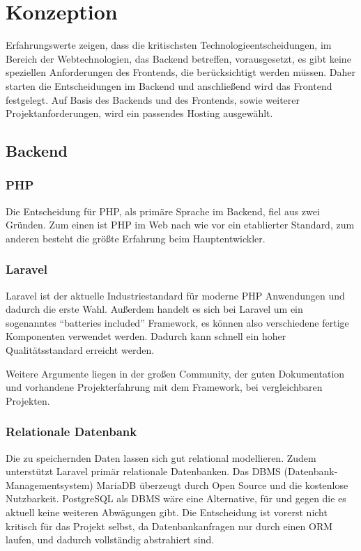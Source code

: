 \section{Konzeption}
Erfahrungswerte zeigen, dass die kritischsten Technologieentscheidungen, im Bereich der Webtechnologien, das Backend betreffen, vorausgesetzt, es gibt keine speziellen Anforderungen des Frontends, die berücksichtigt werden müssen.
Daher starten die Entscheidungen im Backend und anschließend wird das Frontend festgelegt.
Auf Basis des Backends und des Frontends, sowie weiterer Projektanforderungen, wird ein passendes Hosting ausgewählt.

\subsection{Backend}

\subsubsection{PHP}
Die Entscheidung für PHP, als primäre Sprache im Backend, fiel aus zwei Gründen.
Zum einen ist PHP im Web nach wie vor ein etablierter Standard, zum anderen besteht die größte Erfahrung beim Hauptentwickler.

\subsubsection{Laravel}
Laravel ist der aktuelle Industriestandard für moderne PHP Anwendungen und dadurch die erste Wahl.
Außerdem handelt es sich bei Laravel um ein sogenanntes \enquote{batteries included} Framework, es können also verschiedene fertige Komponenten verwendet werden.
Dadurch kann schnell ein hoher Qualitätsstandard erreicht werden.

Weitere Argumente liegen in der großen Community, der guten Dokumentation und vorhandene Projekterfahrung mit dem Framework, bei vergleichbaren Projekten.

\subsubsection{Relationale Datenbank}
Die zu speichernden Daten lassen sich gut relational modellieren.
Zudem unterstützt Laravel primär relationale Datenbanken.
Das DBMS (Datenbank-Managementsystem) MariaDB überzeugt durch Open Source und die kostenlose Nutzbarkeit.
PostgreSQL als DBMS wäre eine Alternative, für und gegen die es aktuell keine weiteren Abwägungen gibt.
Die Entscheidung ist vorerst nicht kritisch für das Projekt selbst, da Datenbankanfragen nur durch einen ORM laufen, und dadurch vollständig abstrahiert sind.
\newpage

